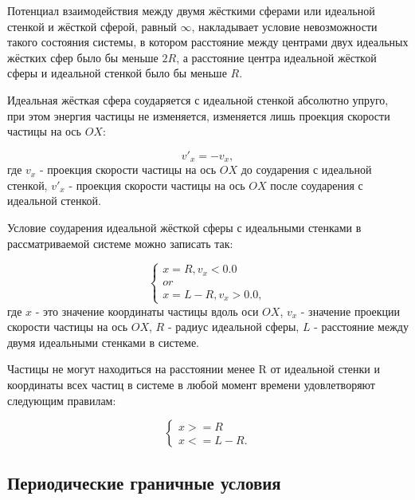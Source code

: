 \documentclass{article}
\begin{document}
Потенциал взаимодействия между двумя жёсткими сферами или идеальной стенкой и жёсткой сферой, равный $ \infty $, накладывает условие невозможности такого состояния системы, в котором расстояние между центрами двух идеальных жёстких сфер было бы меньше $ 2R $, а расстояние центра идеальной жёсткой сферы и идеальной стенкой было бы меньше $ R $.

Идеальная жёсткая сфера соударяется с идеальной стенкой абсолютно упруго, при этом энергия частицы не изменяется, изменяется лишь проекция скорости частицы на ось $ OX $:

\begin{equation}
    v'_x = -v_x,
\end{equation}
где $ v_x $ - проекция скорости частицы на ось $ OX $ до соударения с идеальной стенкой, $ v'_x $ - проекция скорости частицы на ось $ OX $ после соударения с идеальной стенкой.

Условие соударения идеальной жёсткой сферы с идеальными стенками в рассматриваемой системе можно записать так:

\begin{equation}\label{eq:condition_of_collision_with_ideal_wall}
    \begin{cases}
        x = R, v_x < 0.0
        \\
        or
        \\
        x = L - R, v_x > 0.0,
    \end{cases}
\end{equation}
где $ x $ - это значение координаты частицы вдоль оси $ OX $, $ v_x $ - значение проекции скорости частицы на ось $ OX $, $ R $ - радиус идеальной сферы, $ L $ - расстояние между двумя идеальными стенками в системе.

Частицы не могут находиться на расстоянии менее R от идеальной стенки и координаты всех частиц в системе в любой момент времени удовлетворяют следующим правилам:

\begin{equation}\label{eq:particles_and_ideal_wall}
    \begin{cases}
        x >= R
        \\
        x <= L - R.
    \end{cases}
\end{equation}


\subsection{Периодические граничные условия}
\end{document}
